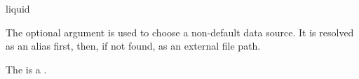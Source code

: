 \clearpage

\begin{docEnvironment}[doc
  new=2025-11-21,doclang/environment
  content=template]{liquid}{}

  The optional argument  is used to
  choose a non-default data source. %
  It is resolved as an alias first, then, if not found, as an external file
  path. %

  The  is a  . %
\end{docEnvironment}

